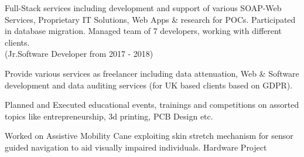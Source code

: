 \documentclass[9pt]{ShumailaAhmed-Resume}
\begin{document}
\begin{minipage}[t]{0.66\textwidth}
\vspace{5pt}

 
\noindent
\hspace{5em}%
\begin{minipage}{0.85\textwidth\vspace{2pt}}
{\small Full-Stack services including development and support of various SOAP-Web Services, Proprietary IT Solutions, Web Apps \& research for POCs. Participated in database migration. Managed team of 7 developers, working with different clients.\\
(Jr.Software Developer from 2017 - 2018)}\\
\end{minipage}
\sectionsep

\vspace{5pt}

 
\descript{ }
\noindent
\hspace{5em}%
\begin{minipage}{0.85\textwidth\vspace{2pt}}
{\small Provide various services as freelancer including data attenuation, Web \& Software development and data auditing services (for UK based clients based on GDPR).
}
\end{minipage}

\vspace{5pt}

 
\noindent
\hspace{5em}%
\begin{minipage}{0.85\textwidth\vspace{2pt}}
{\small Planned and Executed educational events, trainings and competitions on assorted topics like entrepreneurship, 3d printing, PCB Design etc. } 
\end{minipage}

\vspace{5pt}

 
\noindent
\hspace{5em}%
\begin{minipage}{0.85\textwidth\vspace{2pt}}
{\small Worked on Assistive Mobility Cane exploiting skin stretch mechanism for sensor guided navigation to aid visually impaired individuals. Hardware Project}
\end{minipage}
\sectionsep
{}
\vspace{7pt}

\end{minipage}
\end{document}
